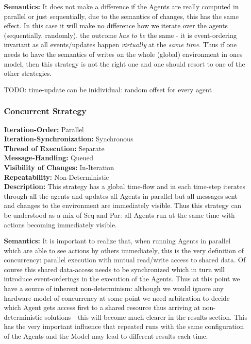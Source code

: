 \textbf{Semantics:} It does not make a difference if the Agents are really computed in parallel or just sequentially, due to the semantics of changes, this has the same effect. In this case it will make no difference how we iterate over the agents (sequentially, randomly), the outcome \textit{has to be} the same - it is event-ordering invariant as all events/updates happen \textit{virtually} at the \textit{same time}. Thus if one needs to have the semantics of writes on the whole (global) environment in ones model, then this strategy is not the right one and one should resort to one of the other strategies.

TODO: time-update can be inidividual: random offset for every agent


\subsubsection{Concurrent Strategy}
\textbf{Iteration-Order:} Parallel \\
\textbf{Iteration-Synchronization:}	Synchronous \\
\textbf{Thread of Execution:} Separate \\
\textbf{Message-Handling:} Queued \\
\textbf{Visibility of Changes:}	In-Iteration \\
\textbf{Repeatability:}	Non-Deterministic \\

\textbf{Description:} This strategy has a global time-flow and in each time-step iterates through all the agents and updates all Agents in parallel but all messages sent and changes to the environment are immediately visible. Thus this strategy can be understood as a mix of Seq and Par: all Agents run at the same time with actions becoming immediately visible.

\textbf{Semantics:} It is important to realize that, when running Agents in parallel which are able to see actions by others immediately, this is the very definition of concurrency: parallel execution with mutual read/write access to shared data. Of course this shared data-access needs to be synchronized which in turn will introduce event-orderings in the execution of the Agents. Thus at this point we have a source of inherent non-determinism: although we would ignore any hardware-model of concurrency at some point we need arbitration to decide which Agent gets access first to a shared resource thus arriving at non-deterministic solutions - this will become much clearer in the results-section. This has the very important influence that repeated runs with the same configuration of the Agents and the Model may lead to different results each time.

